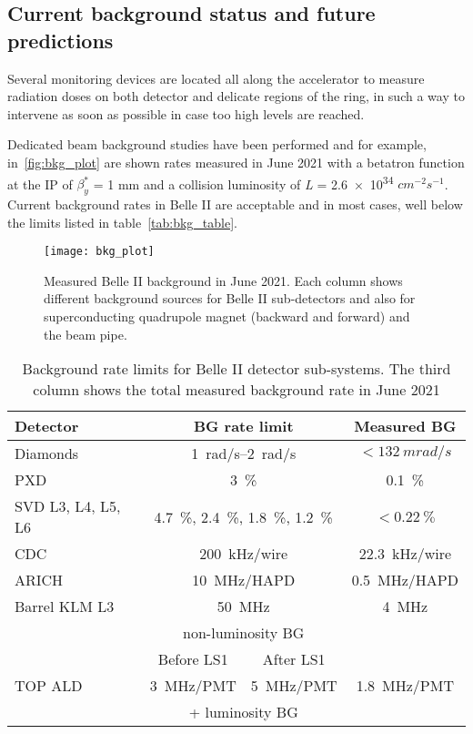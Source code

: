 \subsection{Current background status and future predictions}\label{sec:bkg_predictions}

Several monitoring devices are located all along the accelerator to measure radiation doses on both detector and delicate regions of the ring, in such a way to intervene as soon as possible in case too high levels are reached.

Dedicated beam background studies have been performed and for example, in~\autoref{fig:bkg_plot} are shown rates measured in June 2021 with a betatron function at the IP of $\beta_{y}^{*}$ = 1 mm and a collision luminosity of \textit{L} = \num{2.6e34} $cm^{-2} s^{-1}$. Current background rates in Belle II are acceptable and in most cases, well below the limits listed in table~\autoref{tab:bkg_table}.\\

\begin{figure}[h!]
\centering
\texttt{[image: bkg\_plot]}
\caption{Measured Belle II background in June 2021. Each column shows different background sources for Belle II sub-detectors and also for superconducting quadrupole magnet (backward and forward) and the beam pipe.}
\label{fig:bkg_plot}
\end{figure}


\begin{table}[htb]
\centering
    \begin{tabular}{lccc}
    \hline\hline
    Detector & \multicolumn{2}{c}{BG rate limit} & Measured BG\\
    \hline
    Diamonds & \multicolumn{2}{c}{\SIrange{1}{2}{rad/s}} & $<\SI{132}{mrad/s}$\\
    PXD & \multicolumn{2}{c}{\SI{3}{\%}} & \SI{0.1}{\%}\\
    SVD L3, L4, L5, L6 & \multicolumn{2}{c}{\SI{4.7}{\%}, \SI{2.4}{\%}, \SI{1.8}{\%}, \SI{1.2}{\%}} & $<\SI{0.22}{\%}$\\
    CDC & \multicolumn{2}{c}{\SI{200}{kHz/wire}} & \SI{22.3}{kHz/wire}\\
    ARICH & \multicolumn{2}{c}{\SI{10}{MHz/HAPD}} & \SI{0.5}{MHz/HAPD}\\
    Barrel KLM L3 & \multicolumn{2}{c}{\SI{50}{MHz}} & \SI{4}{MHz}\\
    & \multicolumn{2}{c}{non-luminosity BG} &\\\cline{2-3}
    & Before LS1 & After LS1 &\\\cline{2-3}
    TOP ALD & \SI{3}{MHz/PMT} & \SI{5}{MHz/PMT} & \SI{1.8}{MHz/PMT}\\
    & \multicolumn{2}{c}{+ luminosity BG} &\\
    \hline\hline
    \end{tabular}
    \caption{Background rate limits for Belle II detector sub-systems. The third column shows the total measured background rate in June 2021}
    \label{tab:bkg_table}
\end{table}

